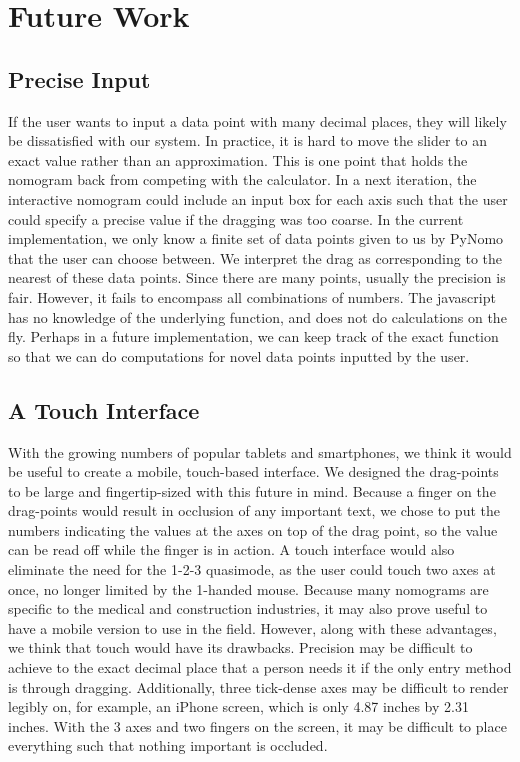 \documentclass{proc}
\begin{document}
\section{Future Work}
\subsection{Precise Input}
If the user wants to input a data point with many decimal places, they
will likely be dissatisfied with our system. In practice, it is hard
to move the slider to an exact value rather than an approximation.
This is one point that holds the nomogram back from competing with the
calculator. In a next iteration, the interactive nomogram could
include an input box for each axis such that the user could specify a
precise value if the dragging was too coarse. In the current
implementation, we only know a finite set of data points given to us
by PyNomo that the user can choose between. We interpret the drag as
corresponding to the nearest of these data points. Since there are
many points, usually the precision is fair. However, it fails to
encompass all combinations of numbers. The javascript has no knowledge
of the underlying function, and does not do calculations on the fly.
Perhaps in a future implementation, we can keep track of the exact
function so that we can do computations for novel data points inputted
by the user.

\subsection{A Touch Interface}
With the growing numbers of popular tablets and smartphones, we think
it would be useful to create a mobile, touch-based interface. We
designed the drag-points to be large and fingertip-sized with this
future in mind. Because a finger on the drag-points would result in
occlusion of any important text, we chose to put the numbers
indicating the values at the axes on top of the drag point, so the
value can be read off while the finger is in action. A touch interface
would also eliminate the need for the 1-2-3 quasimode, as the user
could touch two axes at once, no longer limited by the 1-handed mouse.
Because many nomograms are specific to the medical and construction
industries, it may also prove useful to have a mobile version to use
in the field. However, along with these advantages, we think that
touch would have its drawbacks. Precision may be difficult to achieve
to the exact decimal place that a person needs it if the only entry
method is through dragging. Additionally, three tick-dense axes may be
difficult to render legibly on, for example, an iPhone screen, which
is only 4.87 inches by 2.31 inches. With the 3 axes and two fingers on
the screen, it may be difficult to place everything such that nothing
important is occluded.
\end{document}
